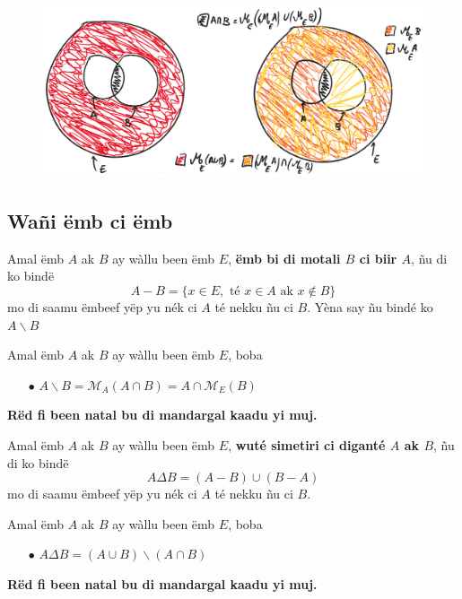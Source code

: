 \documentclass[twoside, a4paper]{article}
\begin{document}
\begin{figure}[ht]
  \centering
  \includegraphics[scale = 0.5]{image/motali_emb_teg.png}
  \label{fig:motali_emb_teg}
\end{figure}

\subsection{Wañi ëmb ci ëmb}
\begin{tcolorbox}[enhanced jigsaw,breakable,pad at break*=1mm, colback=red!5!white,colframe=white!75!black,title= Téeki,watermark color=white]
  Amal ëmb $A$ ak $B$ ay wàllu been ëmb $E$, \textbf{ëmb bi di motali $B$ ci biir $A$}, ñu di ko bindë $$A - B = \big \{x \in E, \text{ té } x \in A \text{ ak } x \not \in B\}$$
  mo di saamu ëmbeef yëp yu nék ci $A$ té nekku ñu ci $B$. Yèna say ñu bindé ko $A \backslash B$
\end{tcolorbox}

\begin{tcolorbox}[enhanced jigsaw,breakable,pad at break*=1mm, colback=orange!5!white,colframe=white!75!black,title= Seetlu,
    watermark color=white]
  Amal ëmb $A$ ak $B$ ay wàllu been ëmb $E$, boba
  \begin{itemize}
    \item[$\bullet$] $A\backslash B = \mathcal{M}_A (A\cap B) = A \cap \mathcal{M}_E (B)$
  \end{itemize}
\end{tcolorbox}
\textbf{Rëd fi been natal bu di mandargal kaadu yi muj.}

\begin{tcolorbox}[enhanced jigsaw,breakable,pad at break*=1mm, colback=red!5!white,colframe=white!75!black,title= Téeki,watermark color=white]
  Amal ëmb $A$ ak $B$ ay wàllu been ëmb $E$, \textbf{wuté simetiri ci diganté $A$ ak $B$}, ñu di ko bindë $$A \Delta  B = (A-B) \cup (B-A)$$
  mo di saamu ëmbeef yëp yu nék ci $A$ té nekku ñu ci $B$.
\end{tcolorbox}

\begin{tcolorbox}[enhanced jigsaw,breakable,pad at break*=1mm, colback=orange!5!white,colframe=white!75!black,title= Seetlu,
    watermark color=white]
  Amal ëmb $A$ ak $B$ ay wàllu been ëmb $E$, boba
  \begin{itemize}
    \item[$\bullet$] $A \Delta  B = (A \cup B) \backslash (A \cap B)$
  \end{itemize}
\end{tcolorbox}
\textbf{Rëd fi been natal bu di mandargal kaadu yi muj.}
\end{document}
